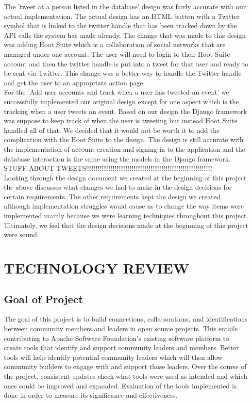 \documentclass[draftclsnofoot,10pt,onecolumn]{IEEEtran} %
\begin{document}
The 'tweet at a person listed in the database' design was fairly accurate with our actual implementation. The actual design has an HTML button with a Twitter symbol that is linked to the twitter handle that has been tracked down by the API calls the system has made already. The change that was made to this design was adding Hoot Suite which is a collaboration of social networks that are managed under one account. The user will need to login to their Hoot Suite account and then the twitter handle is put into a tweet for that user and ready to be sent via Twitter. This change was a better way to handle the Twitter handle and get the user to an appropriate action page. \\

For the 'Add user accounts and track when a user has tweeted an event' we successfully implemented our original design except for one aspect which is the tracking when a user tweets an event. Based on our design the Django framework was suppose to keep track of when the user is tweeting but instead Hoot Suite handled all of that. We decided that it would not be worth it to add the complication with the Hoot Suite to the design. The design is still accurate with the implementation of account creation and signing in to the application and the database interaction is the same using the models in the Django framework. \\

STUFF ABOUT TWEETS!!!!!!!!!!!!!!!!!!!!!!!!!!!!!!!!!!!!!!!!!!!!!!!!!!!!!!!!!!!!!!!!!!! \\

Looking through the design document we created at the beginning of this project the above discusses what changes we had to make in the design decisions for certain requirements. The other requirements kept the design we created although implementation struggles would cause us to change the way items were implemented mainly because we were learning techniques throughout this project. Ultimately, we feel that the design decisions made at the beginning of this project were sound.

\section{TECHNOLOGY REVIEW}

\subsection{Goal of Project} 
The goal of this project is to build connections, collaborations, and identifications between community members and leaders
in open source projects. This entails contributing to Apache Software Foundation’s existing software platform to create tools
that identify and support community leaders and members. Better tools will help identify potential community leaders which
will then allow community builders to engage with and support those leaders. Over the course of the project, consistent
updates check what tools were used as intended and which ones could be improved and expanded. Evaluation of the tools
implemented is done in order to measure its significance and effectiveness. \\
\end{document}

